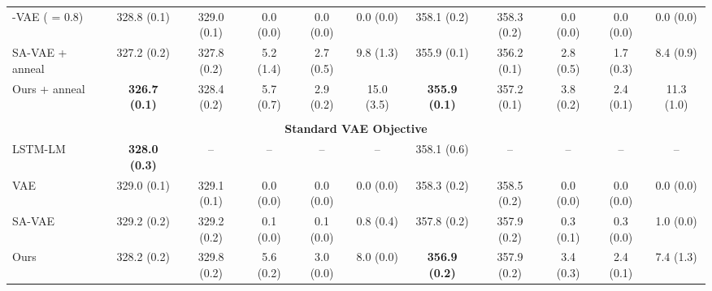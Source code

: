 \documentclass{article} \usepackage{iclr2019_conference,times}
\begin{document}
\begin{table}[h]
{\begin{tabular}{lccccc|ccccc}
    -VAE ( = 0.8) &328.8 (0.1)   &329.0 (0.1) &0.0 (0.0)   &0.0 (0.0) &0.0 (0.0)  &358.1 (0.2)  &358.3 (0.2) &0.0 (0.0)  &0.0 (0.0) & 0.0 (0.0) \\
    SA-VAE + anneal          &327.2 (0.2) &327.8 (0.2) &5.2 (1.4)   &2.7 (0.5)   &9.8 (1.3) &355.9 (0.1)     &356.2 (0.1)       &2.8 (0.5)     &1.7 (0.3) & 8.4 (0.9) \\
    Ours + anneal               &\textbf{326.7 (0.1)}  &328.4 (0.2) &5.7 (0.7)   &2.9 (0.2)  &15.0 (3.5) &\textbf{355.9 (0.1)}  &357.2 (0.1) &3.8 (0.2)     &2.4 (0.1)  & 11.3 (1.0) \\
    \midrule
    \vspace{-9pt} \\
    \multicolumn{11}{c}{\bf Standard VAE Objective} \vspace{3pt} \\
    LSTM-LM              &\textbf{328.0 (0.3)}     &--            &--    &--   &-- &358.1 (0.6)    &--   &--      &--   &-- \\
    VAE                         &329.0 (0.1)   &329.1 (0.1) &0.0 (0.0)   &0.0 (0.0) &0.0 (0.0)   &358.3 (0.2)   &358.5 (0.2)  &0.0 (0.0)     &0.0 (0.0)   &0.0 (0.0)\\
    SA-VAE                      &329.2 (0.2) &329.2 (0.2)  &0.1 (0.0)   &0.1 (0.0) &0.8 (0.4)  &357.8 (0.2)  &357.9 (0.2)  &0.3 (0.1)     &0.3 (0.0) &1.0 (0.0) \\
    Ours                        &328.2 (0.2)   &329.8 (0.2)     &5.6 (0.2)   &3.0 (0.0) &8.0 (0.0)  &\textbf{356.9 (0.2)}  &357.9 (0.2) &3.4 (0.3)  &2.4 (0.1) &7.4 (1.3)  \\    
    \bottomrule
    \end{tabular}}
\end{table}
\end{document}
